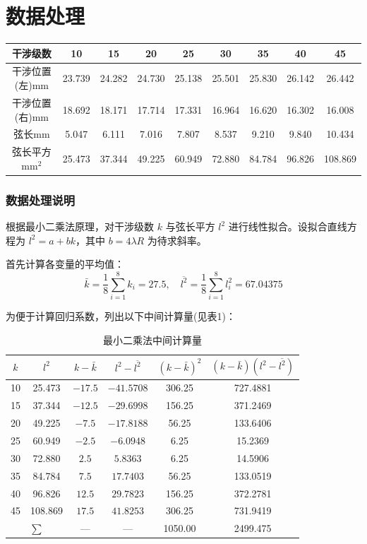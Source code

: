 \documentclass[12pt,a4paper]{article}
\begin{document}
	\section{数据处理}
	\begin{tabular}{|c|c|c|c|c|c|c|c|c|}
		\hline
		干涉级数 & 10 & 15 & 20 & 25 & 30 & 35 & 40 & 45 \\
		\hline
		干涉位置 (左)$\mathrm{mm}$ & 23.739 & 24.282 & 24.730 & 25.138 & 25.501 & 25.830 & 26.142 & 26.442 \\
		\hline
		干涉位置 (右)$\mathrm{mm}$ & 18.692 & 18.171 & 17.714 & 17.331 & 16.964 & 16.620 & 16.302 & 16.008 \\
		\hline
		弦长$\mathrm{mm}$ & 5.047 & 6.111 & 7.016 & 7.807 & 8.537 & 9.210 & 9.840 & 10.434 \\
		\hline
		弦长平方$\mathrm{mm}^2$ & 25.473 & 37.344 & 49.225 & 60.949 & 72.880 & 84.784 & 96.826 & 108.869 \\
		\hline
	\end{tabular}

	\subsubsection*{数据处理说明}
	\par 根据最小二乘法原理，对干涉级数 $k$ 与弦长平方 $l^2$ 进行线性拟合。设拟合直线方程为 $l^2 = a + bk$，其中 $b = 4\lambda R$ 为待求斜率。
	\par 首先计算各变量的平均值：
	\[
	\bar{k} = \frac{1}{8}\sum_{i=1}^{8}k_i = 27.5,\quad
	\overline{l^2} = \frac{1}{8}\sum_{i=1}^{8}l_i^2 = 67.04375
	\]
	\par 为便于计算回归系数，列出以下中间计算量(见表1)：

	\begin{table}[!htbp]
		\centering
		\begin{tabular}{|c|c|c|c|c|c|}
			\hline
			$k$ & $l^2$ & $k-\bar{k}$ & $l^2-\overline{l^2}$ & $(k-\bar{k})^2$ & $(k-\bar{k})(l^2-\overline{l^2})$ \\
			\hline
			10 & 25.473  & $-17.5$ & $-41.5708$ & 306.25  & 727.4881 \\
			\hline
			15 & 37.344  & $-12.5$ & $-29.6998$ & 156.25  & 371.2469 \\
			\hline
			20 & 49.225  & $-7.5$  & $-17.8188$ & 56.25   & 133.6406 \\
			\hline
			25 & 60.949  & $-2.5$  & $-6.0948$  & 6.25    & 15.2369 \\
			\hline
			30 & 72.880  & $2.5$   & $5.8363$   & 6.25    & 14.5906 \\
			\hline
			35 & 84.784  & $7.5$   & $17.7403$  & 56.25   & 133.0519 \\
			\hline
			40 & 96.826  & $12.5$  & $29.7823$  & 156.25  & 372.2781 \\
			\hline
			45 & 108.869 & $17.5$  & $41.8253$  & 306.25  & 731.9419 \\
			\hline
			\multicolumn{2}{|c|}{$\sum$} & — & — & 1050.00 & 2499.475 \\
			\hline
		\end{tabular}
		\caption{最小二乘法中间计算量}
	\end{table}
\end{document}
